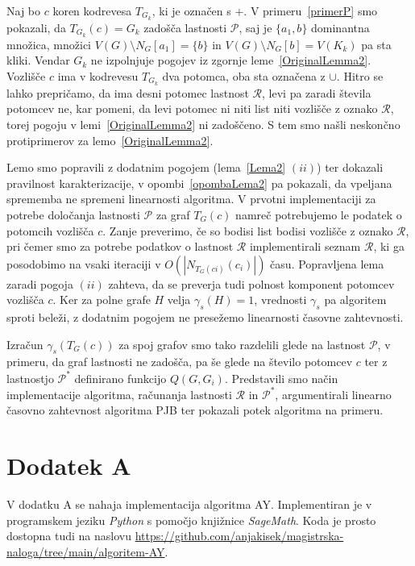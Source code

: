 \documentclass[12pt,a4paper,twoside]{article}
\theoremstyle{definition} %
\theoremstyle{plain} %
\numberwithin{equation}{section}  %
\begin{document}
Naj bo $c$ koren kodrevesa $T_{G_k}$, ki je označen s $+$. V primeru~\ref{primerP} smo pokazali, da $T_{G_k}(c) = G_k$ zadošča lastnosti $\mathcal{P}$, saj je $\{a_1, b\}$ dominantna množica, množici $V(G) \setminus N_G[a_1] = \{b\}$ in $V(G) \setminus N_G[b] = V(K_k)$ pa sta kliki. Vendar $G_k$ ne izpolnjuje pogojev iz zgornje leme~\ref{OriginalLemma2}. Vozlišče $c$ ima v kodrevesu $T_{G_k}$ dva potomca, oba sta označena z $\cup$. Hitro se lahko prepričamo, da ima desni potomec lastnost $\mathcal{R}$, levi pa zaradi števila potomcev ne, kar pomeni, da levi potomec ni niti list niti vozlišče z oznako $\mathcal{R}$, torej pogoju v lemi~\ref{OriginalLemma2} ni zadoščeno. S tem smo našli neskončno protiprimerov za lemo~\ref{OriginalLemma2}.

Lemo smo popravili z dodatnim pogojem (lema~\ref{Lema2} $(ii)$) ter dokazali pravilnost karakterizacije, v opombi~\ref{opombaLema2} pa pokazali, da vpeljana sprememba ne spremeni linearnosti algoritma. V prvotni implementaciji za potrebe določanja lastnosti $\mathcal{P}$ za graf $T_G(c)$ namreč potrebujemo le podatek o potomcih vozlišča $c$. Zanje preverimo, če so bodisi list bodisi vozlišče z oznako $\mathcal{R}$, pri čemer smo za potrebe podatkov o lastnost $\mathcal{R}$ implementirali seznam $\mathcal{R}$, ki ga posodobimo na vsaki iteraciji v $O(|N_{T_G(ci)}(c_i)|)$ času. Popravljena lema zaradi pogoja $(ii)$ zahteva, da se preverja tudi polnost komponent potomcev vozlišča $c$. Ker za polne grafe $H$ velja $\gamma_s(H) = 1$, vrednosti $\gamma_s$ pa algoritem sproti beleži, z dodatnim pogojem ne presežemo linearnosti časovne zahtevnosti.

Izračun $\gamma_s(T_G(c))$ za spoj grafov smo tako razdelili glede na lastnost $\mathcal{P}$, v primeru, da graf lastnosti ne zadošča, pa še glede na število potomcev $c$ ter z lastnostjo $\mathcal{P^*}$ definirano funkcijo $Q(G, G_i)$. Predstavili smo način implementacije algoritma, računanja lastnosti $\mathcal{R}$ in $\mathcal{P^*}$, argumentirali linearno časovno zahtevnost algoritma PJB ter pokazali potek algoritma na primeru.
\vfill
\cleardoublepage     

\section*{Dodatek A}\label{sec:dodatekA}
V dodatku A se nahaja implementacija algoritma AY. Implementiran je v programskem jeziku \emph{Python} s pomočjo knjižnice \emph{SageMath}. Koda je prosto dostopna tudi na naslovu \url{https://github.com/anjakisek/magistrska-naloga/tree/main/algoritem-AY}.
\end{document}
